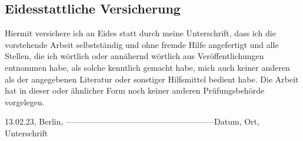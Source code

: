 \documentclass[oneside,bibliography=totocnumbered,BCOR=5mm]{scrbook}
\begin{document}
\begin{appendix}
\section*{Eidesstattliche Versicherung}
Hiermit versichere ich an Eides statt durch meine Unterschrift, dass ich die vorstehende Arbeit selbstst\"andig und ohne fremde Hilfe angefertigt und alle Stellen, die ich w\"ortlich oder ann\"ahernd w\"ortlich aus Ver\"offentlichungen entnommen habe, als solche kenntlich gemacht habe, mich auch keiner anderen als der angegebenen Literatur oder sonstiger Hilfsmittel bedient habe. Die Arbeit hat in dieser oder \"ahnlicher Form noch keiner anderen Pr\"ufungsbeh\"orde vorgelegen.\\
\linebreak[4]
\linebreak[4]
\linebreak[4]
\raggedright13.02.23, Berlin,
\linebreak[4]
------------------------------------------------------\linebreak[4]
Datum, Ort, Unterschrift

\end{appendix}
\end{document}
